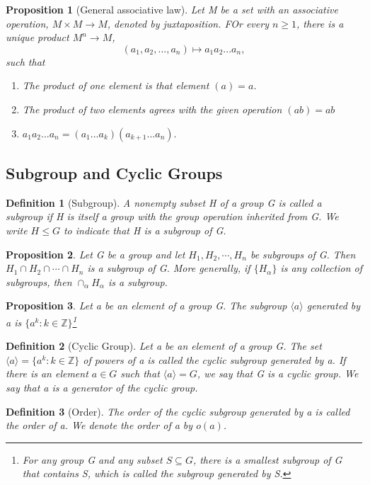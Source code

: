 \documentclass[12pt]{article}
\newtheorem{definition}{Definition}[subsection]
\newtheorem{proposition}{Proposition}[subsection]
\begin{document}
    \begin{proposition}[General associative law]
        Let M be a set with an associative operation, $M \times M \rightarrow M$, denoted by juxtaposition. FOr every $n \geq 1$, there is a unique product $M^n \rightarrow M$,
        \[(a_1, a_2, ..., a_n) \mapsto a_1a_2...a_n,\]
        such that
        \begin{enumerate}
            \item The product of one element is that element $(a) = a$.
            \item The product of two elements agrees with the given operation $(ab) = ab$
            \item $a_1a_2...a_n = (a_1 ... a_k)(a_{k+1}...a_n).$
        \end{enumerate}

    \end{proposition}
\subsection{Subgroup and Cyclic Groups}
    \begin{definition}[Subgroup]
        A nonempty subset H of a group G is called a subgroup if H is itself a group with the group operation inherited from G. We write $H \leq G$ to indicate that H is a subgroup of G.
    \end{definition}
    
    \begin{proposition}
        Let G be a group and let $H_1, H_2, \cdots, H_n$ be subgroups of G. Then $H_1\cap H_2\cap \cdots\cap H_n$ is a subgroup of G. More generally, if $\{H_{\alpha}\}$ is any collection of subgroups, then $\cap_{\alpha}H_{\alpha}$ is a subgroup.
    \end{proposition}
    \begin{proposition}
        Let a be an element of a group G. The subgroup $\langle a\rangle$ generated by a is $\{a^k : k\in \mathbb{Z}\}$\footnote{For any group G and any subset $S \subseteq G$, there is a smallest subgroup of G that contains S, which is called the subgroup generated by S.}
    \end{proposition}
    \begin{definition}[Cyclic Group]
        Let a be an element of a group G. The set $\langle a \rangle = \{a^k : k \in \mathbb{Z}\}$ of powers of a is called the cyclic subgroup generated by a. If there is an element $a \in G$ such that $\langle a \rangle = G$, we say that G is a cyclic group. We say that a is a generator of the cyclic group.
    \end{definition}
    \begin{definition}[Order]
        The order of the cyclic subgroup generated by a is called the order of a. We denote the order of a by $o(a)$.
    \end{definition}
    
\end{document}
